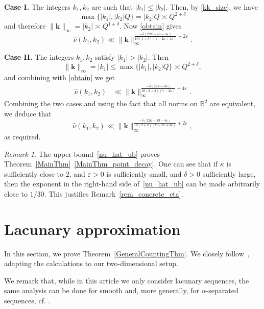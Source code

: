 \documentclass[12pt, reqno]{amsart}
\theoremstyle{definition}
\theoremstyle{remark}
\newtheorem{remark}[thm]{Remark}
\numberwithin{equation}{section}
\def\alp{{\alpha}} \def\bfalp{{\boldsymbol \alpha}}
\def\eps{\varepsilon}
\def\le{\leqslant} \def\ge{\geqslant}
\def\leq{\leqslant}
\def \bR {\mathbb R}
\def \bk {\mathbf k}
\begin{document}
\bigskip

\textbf{Case I.} The integers $k_1, k_2$ are such that $|k_1| \leq |k_2|.$ Then, by \eqref{kk_size}, we have
\begin{equation*} 
\max\{ |k_1|, |k_2|Q\} = |k_2| Q \asymp Q^{2+\delta} \end{equation*} 
and therefore $\|\bk\|_\infty = |k_2| \asymp Q^{1+\delta}.$  Now \eqref{obtain} gives 
\[ 
\widehat{\nu}(k_1, k_2) \ll \|\bk \|_\infty^{\frac{-\delta (22\kappa -43-4\eps)}{10(1+\delta)(7-2\kappa+4\eps)}+2\varepsilon}.  
\]

\bigskip

\textbf{Case II.} The integers $k_1, k_2$ satisfy $|k_1| > |k_2|.$ Then 
\[ \|\bk \|_\infty = |k_1| \le \max\{ |k_1|, |k_2|Q  \}  \asymp Q^{2+\delta},  \]
and combining with \eqref{obtain} we get
\begin{align*}
\widehat{\nu}(k_1, k_2) 
&\ll \| \bk \|_\infty^{\frac{-\delta (22\kappa -43)}
{10(2+\delta)(7-2\kappa)} + 4\varepsilon}. 
\end{align*}
Combining the two cases and using the fact that all norms on $\bR^2$ are equivalent, we deduce that 
\begin{equation} \label{nu_hat_ub}
\widehat{\nu}(k_1, k_2) \ll \|\bk \|_\infty^{\frac{-\delta (22\kappa -43-4\eps)}{10(2+\delta)(7-2\kappa+4\eps)}+2\varepsilon},  
\end{equation}
as required.

\begin{remark} \label{rem_justification_concrete_eta}
The upper bound~\eqref{nu_hat_ub} proves Theorem~\ref{MainThm}~\eqref{MainThm_point_decay}. One can see that if $\kappa$ is sufficiently close to $2$, and $\varepsilon>0$ is sufficiently small, and $\delta>0$ sufficiently large, then the exponent in the right-hand side of~\eqref{nu_hat_ub} can be made arbitrarily close to $1/30$. This justifies Remark~\ref{rem_concrete_eta}.
\end{remark}

\section{Lacunary approximation}
\label{LacSection}

In this section, we prove Theorem~\ref{GeneralCountingThm}. We closely follow~\cite{PVZZ2022}, adapting the calculations to our two-dimensional setup. 

We remark that, while in this article we only consider lacunary sequences, the same analysis can be done for smooth and, more generally, for $\alp$-separated sequences, cf. \cite{PVZZ2022}. 
\end{document}
